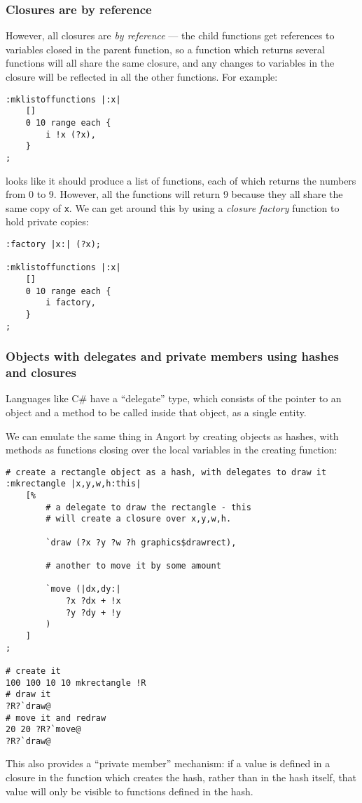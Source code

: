 \subsubsection{Closures are by reference}
However, all closures are \emph{by reference} --- the child functions
get references to variables closed in the parent function, so a function
which returns several functions will all share the same closure, and
any changes to variables in the closure will be reflected in all the 
other functions. For example:
\begin{lstlisting}
:mklistoffunctions |:x|
    []
    0 10 range each {
        i !x (?x),
    }
;
\end{lstlisting}
looks like it should produce a list of functions, each of which
returns the numbers from 0 to 9. However, all the functions will
return 9 because they all share the same copy of \texttt{x}.
We can get around this by using a \emph{closure factory} function to hold
private copies:
\begin{lstlisting}
:factory |x:| (?x);

:mklistoffunctions |:x|
    []
    0 10 range each {
        i factory,
    }
;

\end{lstlisting}

\subsubsection{Objects with delegates and private members using hashes and closures}
Languages like C\# have a ``delegate'' type, which consists of
the pointer to an object and a method to be called inside that
object, as a single entity. 

We can emulate the same thing in Angort by creating objects as
hashes, with methods as functions closing over the local variables
in the creating function:

\begin{lstlisting}
# create a rectangle object as a hash, with delegates to draw it
:mkrectangle |x,y,w,h:this|
    [%
        # a delegate to draw the rectangle - this
        # will create a closure over x,y,w,h.
        
        `draw (?x ?y ?w ?h graphics$drawrect),
        
        # another to move it by some amount
        
        `move (|dx,dy:| 
            ?x ?dx + !x
            ?y ?dy + !y
        )
    ]
;   

# create it
100 100 10 10 mkrectangle !R
# draw it
?R?`draw@
# move it and redraw
20 20 ?R?`move@
?R?`draw@
\end{lstlisting}
This also provides a ``private member'' mechanism: if a value is defined
in a closure in the function which creates the hash, rather than in
the hash itself, that value will only be visible to functions defined
in the hash.



